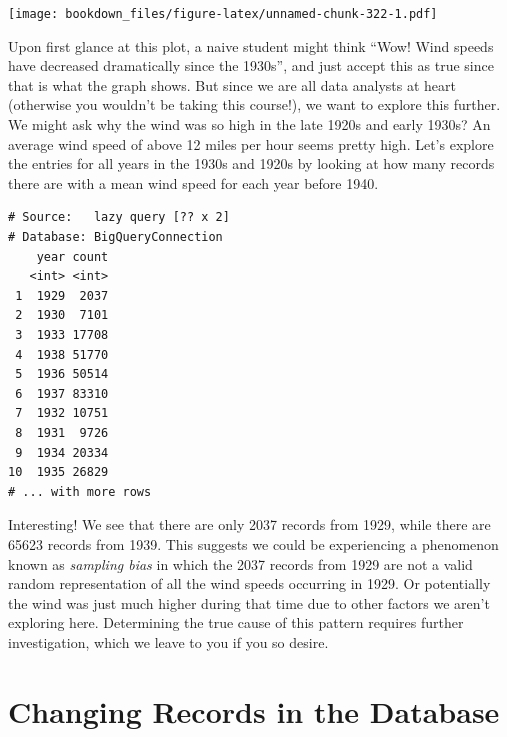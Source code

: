 \documentclass[]{krantz}
\makeatletter
\newenvironment{Shaded}{\begin{snugshade}}{\end{snugshade}}
\newcommand{\KeywordTok}[1]{\textcolor[rgb]{0.27,0.27,0.27}{\textbf{#1}}}
\newcommand{\DataTypeTok}[1]{\textcolor[rgb]{0.27,0.27,0.27}{#1}}
\newcommand{\DecValTok}[1]{\textcolor[rgb]{0.06,0.06,0.06}{#1}}
\newcommand{\StringTok}[1]{\textcolor[rgb]{0.5,0.5,0.5}{#1}}
\newcommand{\OperatorTok}[1]{\textcolor[rgb]{0.43,0.43,0.43}{\textbf{#1}}}
\newcommand{\NormalTok}[1]{#1}
\newenvironment{kframe}{%
\medskip{}
\setlength{\fboxsep}{.8em}
 \def\at@end@of@kframe{}%
 \ifinner\ifhmode%
  \def\at@end@of@kframe{\end{minipage}}%
  \begin{minipage}{\columnwidth}%
 \fi\fi%
 \def\FrameCommand##1{\hskip\@totalleftmargin \hskip-\fboxsep
 \colorbox{shadecolor}{##1}\hskip-\fboxsep
     \hskip-\linewidth \hskip-\@totalleftmargin \hskip\columnwidth}%
 \MakeFramed {\advance\hsize-\width
   \@totalleftmargin\z@ \linewidth\hsize
   \@setminipage}}%
 {\par\unskip\endMakeFramed%
 \at@end@of@kframe}
\renewenvironment{Shaded}{\begin{kframe}}{\end{kframe}}
\makeatother
\begin{document}
\texttt{[image: bookdown\_files/figure-latex/unnamed-chunk-322-1.pdf]}

Upon first glance at this plot, a naive student might think ``Wow! Wind
speeds have decreased dramatically since the 1930s'', and just accept
this as true since that is what the graph shows. But since we are all
data analysts at heart (otherwise you wouldn't be taking this course!),
we want to explore this further. We might ask why the wind was so high
in the late 1920s and early 1930s? An average wind speed of above 12
miles per hour seems pretty high. Let's explore the entries for all
years in the 1930s and 1920s by looking at how many records there are
with a mean wind speed for each year before 1940.

\begin{Shaded}
\end{Shaded}

\begin{verbatim}
# Source:   lazy query [?? x 2]
# Database: BigQueryConnection
    year count
   <int> <int>
 1  1929  2037
 2  1930  7101
 3  1933 17708
 4  1938 51770
 5  1936 50514
 6  1937 83310
 7  1932 10751
 8  1931  9726
 9  1934 20334
10  1935 26829
# ... with more rows
\end{verbatim}

Interesting! We see that there are only 2037 records from 1929, while
there are 65623 records from 1939. This suggests we could be
experiencing a phenomenon known as \emph{sampling bias} in which the
2037 records from 1929 are not a valid random representation of all the
wind speeds occurring in 1929. Or potentially the wind was just much
higher during that time due to other factors we aren't exploring here.
Determining the true cause of this pattern requires further
investigation, which we leave to you if you so desire.

\section{Changing Records in the
Database}\label{changing-records-in-the-database}
\end{document}

